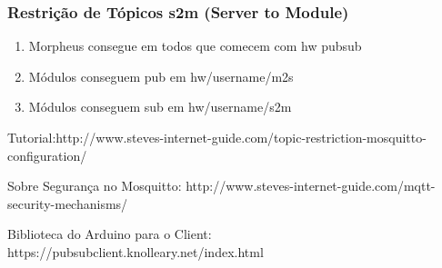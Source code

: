 
\subsubsection{Restrição de Tópicos s2m (Server to Module)}
\begin{enumerate}
\item Morpheus consegue em todos que comecem com hw pubsub
\item Módulos conseguem pub em hw/username/m2s
\item Módulos conseguem sub em hw/username/s2m
\end{enumerate}

Tutorial:http://www.steves-internet-guide.com/topic-restriction-mosquitto-configuration/

Sobre Segurança no Mosquitto: http://www.steves-internet-guide.com/mqtt-security-mechanisms/

Biblioteca do Arduino para o Client: https://pubsubclient.knolleary.net/index.html
